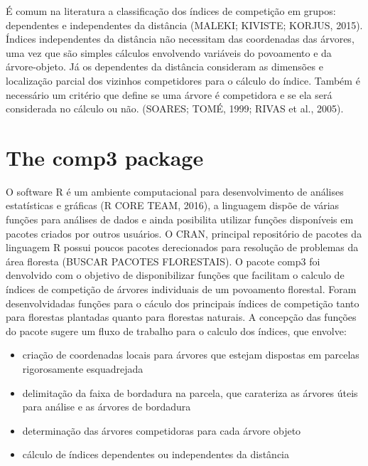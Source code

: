 \documentclass[article]{jss}
\begin{document}
É comum na literatura a classificação dos índices de competição em
grupos: dependentes e independentes da distância (MALEKI; KIVISTE;
KORJUS, 2015). Índices independentes da distância não necessitam das
coordenadas das árvores, uma vez que são simples cálculos envolvendo
variáveis do povoamento e da árvore-objeto. Já os dependentes da
distância consideram as dimensões e localização parcial dos vizinhos
competidores para o cálculo do índice. Também é necessário um critério
que define se uma árvore é competidora e se ela será considerada no
cálculo ou não. (SOARES; TOMÉ, 1999; RIVAS et al., 2005).

\section{The comp3 package}\label{the-comp3-package}

O software R é um ambiente computacional para desenvolvimento de
análises estatísticas e gráficas (R CORE TEAM, 2016), a linguagem dispõe
de várias funções para análises de dados e ainda posibilita utilizar
funções disponíveis em pacotes criados por outros usuários. O CRAN,
principal repositório de pacotes da linguagem R possui poucos pacotes
derecionados para resolução de problemas da área floresta (BUSCAR
PACOTES FLORESTAIS). O pacote comp3 foi denvolvido com o objetivo de
disponibilizar funções que facilitam o calculo de índices de competição
de árvores individuais de um povoamento florestal. Foram desenvolvidadas
funções para o cáculo dos principais índices de competição tanto para
florestas plantadas quanto para florestas naturais. A concepção das
funções do pacote sugere um fluxo de trabalho para o calculo dos
índices, que envolve:

\begin{itemize}
\item
  criação de coordenadas locais para árvores que estejam dispostas em
  parcelas rigorosamente esquadrejada
\item
  delimitação da faixa de bordadura na parcela, que carateriza as
  árvores úteis para análise e as árvores de bordadura
\item
  determinação das árvores competidoras para cada árvore objeto
\item
  cálculo de índices dependentes ou independentes da distância
\end{itemize}
\end{document}
